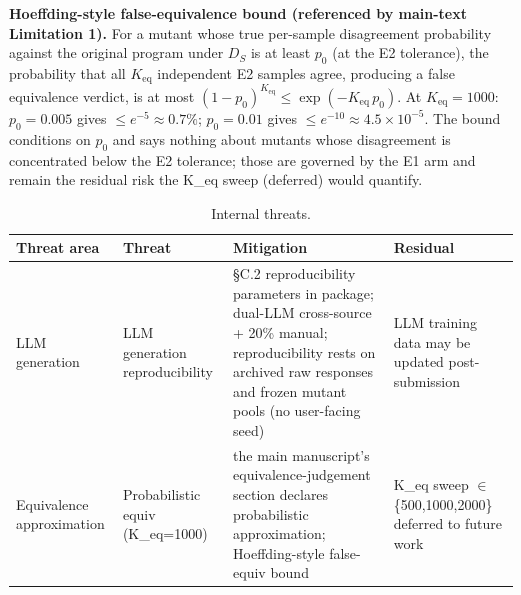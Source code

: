 \documentclass[manuscript,screen,review]{acmart}
\begin{document}
\textbf{Hoeffding-style false-equivalence bound (referenced by
main-text Limitation 1).} For a mutant whose true per-sample
disagreement probability against the original program under $D_S$ is
at least $p_0$ (at the E2 tolerance), the probability that all
$K_{\mathrm{eq}}$ independent E2 samples agree, producing a false
equivalence verdict, is at most $(1-p_0)^{K_{\mathrm{eq}}} \leq
\exp(-K_{\mathrm{eq}}\,p_0)$. At $K_{\mathrm{eq}} = 1000$: $p_0 =
0.005$ gives $\leq e^{-5} \approx 0.7\%$; $p_0 = 0.01$ gives $\leq
e^{-10} \approx 4.5 \times 10^{-5}$. The bound conditions on $p_0$ and
says nothing about mutants whose disagreement is concentrated below the
E2 tolerance; those are governed by the E1 arm and remain the residual
risk the K\_eq sweep (deferred) would quantify.

{%
\begin{longtable}[]{@{}
  >{\raggedright\arraybackslash}p{}
  >{\raggedright\arraybackslash}p{}
  >{\raggedright\arraybackslash}p{}
  >{\raggedright\arraybackslash}p{}@{}}
\caption{Internal threats.}\label{tab:p2-27}\\
\toprule\noalign{}
\begin{minipage}[b]{\linewidth}\raggedright
Threat area
\end{minipage} & \begin{minipage}[b]{\linewidth}\raggedright
Threat
\end{minipage} & \begin{minipage}[b]{\linewidth}\raggedright
Mitigation
\end{minipage} & \begin{minipage}[b]{\linewidth}\raggedright
Residual
\end{minipage} \\
\midrule\noalign{}
\endfirsthead
\endhead
\bottomrule\noalign{}
\endlastfoot
LLM generation & LLM generation reproducibility & §C.2 reproducibility parameters in
package; dual-LLM cross-source + 20\% manual; reproducibility rests on
archived raw responses and frozen mutant pools (no user-facing seed) & LLM training data may be updated
post-submission \\
Equivalence approximation & Probabilistic equiv (K\_eq=1000) & the main manuscript's equivalence-judgement section declares probabilistic
approximation; Hoeffding-style false-equiv bound & K\_eq sweep $\in$
\{500,1000,2000\} deferred to future work \\

\end{longtable}}
\end{document}
